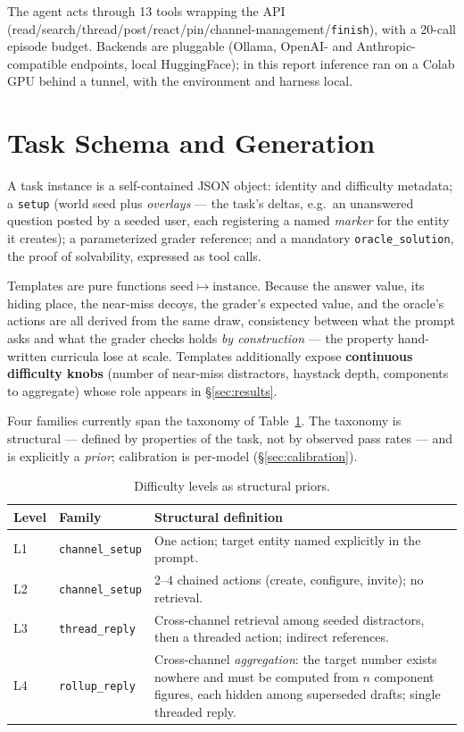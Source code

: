 \documentclass[10pt]{article}
\begin{document}
The agent acts through 13 tools wrapping the API (read/search/thread/post/react/pin/channel-management/\texttt{finish}), with a 20-call episode budget. Backends are pluggable (Ollama, OpenAI- and Anthropic-compatible endpoints, local HuggingFace); in this report inference ran on a Colab GPU behind a tunnel, with the environment and harness local.

\section{Task Schema and Generation}\label{sec:tasks}

A task instance is a self-contained JSON object: identity and difficulty metadata; a \texttt{setup} (world seed plus \emph{overlays} --- the task's deltas, e.g.\ an unanswered question posted by a seeded user, each registering a named \emph{marker} for the entity it creates); a parameterized grader reference; and a mandatory \texttt{oracle\_solution}, the proof of solvability, expressed as tool calls.

Templates are pure functions $\mathrm{seed} \mapsto \mathrm{instance}$. Because the answer value, its hiding place, the near-miss decoys, the grader's expected value, and the oracle's actions are all derived from the same draw, consistency between what the prompt asks and what the grader checks holds \emph{by construction} --- the property hand-written curricula lose at scale. Templates additionally expose \textbf{continuous difficulty knobs} (number of near-miss distractors, haystack depth, components to aggregate) whose role appears in \S\ref{sec:results}.

Four families currently span the taxonomy of Table~\ref{tab:levels}. The taxonomy is structural --- defined by properties of the task, not by observed pass rates --- and is explicitly a \emph{prior}; calibration is per-model (\S\ref{sec:calibration}).

\begin{table}[t]
\centering\small
\begin{tabular}{@{}llp{7.6cm}@{}}
\toprule
Level & Family & Structural definition \\
\midrule
L1 & \texttt{channel\_setup} & One action; target entity named explicitly in the prompt. \\
L2 & \texttt{channel\_setup} & 2--4 chained actions (create, configure, invite); no retrieval. \\
L3 & \texttt{thread\_reply} & Cross-channel retrieval among seeded distractors, then a threaded action; indirect references. \\
L4 & \texttt{rollup\_reply} & Cross-channel \emph{aggregation}: the target number exists nowhere and must be computed from $n$ component figures, each hidden among superseded drafts; single threaded reply. \\
\bottomrule
\end{tabular}
\caption{Difficulty levels as structural priors.}
\label{tab:levels}
\end{table}
\end{document}
